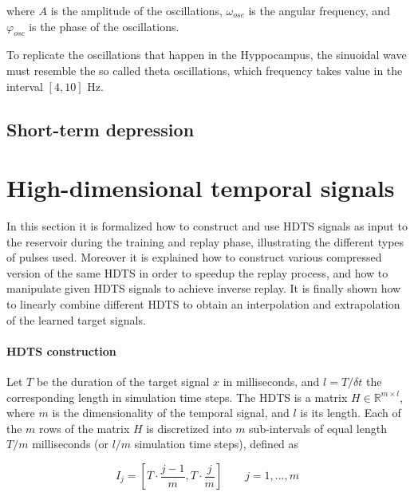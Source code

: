 \documentclass[10pt,a4paper, final]{report} %
\begin{document}
where $A$ is the amplitude of the oscillations, $\omega_{osc}$ is the angular frequency, and $\varphi_{osc}$ is the phase of the oscillations. 

To replicate the oscillations that happen in the Hyppocampus, the sinuoidal wave must resemble the so called theta oscillations, which frequency takes value in the interval $[4,10]$ Hz. 

\subsection{Short-term depression} 

\section{High-dimensional temporal signals}
\label{sec:HDTS}
In this section it is formalized how to construct and use HDTS signals as input to the reservoir during the training and replay phase, illustrating the different types of pulses used. Moreover it is explained how to construct various compressed version of the same HDTS in order to speedup the replay process, and how to manipulate given HDTS signals to achieve inverse replay. It is finally shown how to linearly combine different HDTS to obtain an interpolation and extrapolation of the learned target signals.

\paragraph{HDTS construction}
Let $T$ be the duration of the target signal $x$ in milliseconds, and $l=T/ \delta t$ the corresponding length in simulation time steps. The HDTS is a matrix $H \in \mathbb{R}^{m \times l}$, where $m$ is the dimensionality of the temporal signal, and $l$ is its length. Each of the $m$ rows of the matrix $H$ is discretized into $m$ sub-intervals of equal length $T/m$ milliseconds (or $l/m$ simulation time steps), defined as 

\begin{equation}
I_j = [T \cdot \frac{j-1}{m}, T \cdot \frac{j}{m}] \qquad j = 1, \ldots, m
\label{eq:HDTS_interval}
\end{equation}
\end{document}
